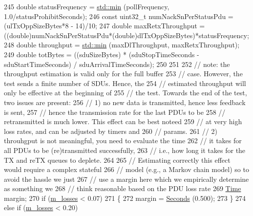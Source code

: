 \begin{DoxyCode}
245   \textcolor{keywordtype}{double} statusFrequency = \hyperlink{80211b_8c_ac6afabdc09a49a433ee19d8a9486056d}{std::min} (pollFrequency, 1.0/statusProhibitSeconds);
246   \textcolor{keyword}{const} uint32\_t numNackSnPerStatusPdu = (ulTxOppSizeBytes*8 - 14)/10;
247   \textcolor{keywordtype}{double} maxRetxThroughput = ((double)numNackSnPerStatusPdu*(\textcolor{keywordtype}{double})dlTxOppSizeBytes)*statusFrequency;
248   \textcolor{keywordtype}{double} throughput = \hyperlink{80211b_8c_ac6afabdc09a49a433ee19d8a9486056d}{std::min} (maxDlThroughput, maxRetxThroughput);
249   \textcolor{keywordtype}{double} totBytes = ((sduSizeBytes) * (sduStopTimeSeconds - sduStartTimeSeconds) / sduArrivalTimeSeconds);
250 
251 
252   \textcolor{comment}{// note: the throughput estimation is valid only for the full buffer}
253   \textcolor{comment}{// case. However, the test sends a finite number of SDUs. Hence, the}
254   \textcolor{comment}{// estimated throughput will only be effective at the beginning of}
255   \textcolor{comment}{// the test. Towards the end of the test, two issues are present:}
256   \textcolor{comment}{//   1) no new data is transmitted, hence less feedback is sent,}
257   \textcolor{comment}{//      hence the transmission rate for the last PDUs to be}
258   \textcolor{comment}{//      retransmitted is much lower. This effect can be best noteed}
259   \textcolor{comment}{//      at very high loss rates, and can be adjusted by timers and}
260   \textcolor{comment}{//      params.}
261   \textcolor{comment}{//   2) throuhgput is not meaningful, you need to evaluate the time}
262   \textcolor{comment}{//      it takes for all PDUs to be (re)transmitted successfully,}
263   \textcolor{comment}{//      i.e., how long it takes for the TX and reTX queues to deplete.}
264 
265   \textcolor{comment}{// Estimating correctly this effect would require a complex stateful}
266   \textcolor{comment}{// model (e.g., a Markov chain model) so to avoid the hassle we just}
267   \textcolor{comment}{// use a margin here which we empirically determine as something we}
268   \textcolor{comment}{// think reasonable based on the PDU loss rate}
269   \hyperlink{classns3_1_1Time}{Time} margin;
270   \textcolor{keywordflow}{if} (\hyperlink{classLteRlcAmE2eTestCase_afbb72ea6f3599c57b19be03be5e43878}{m\_losses} < 0.07)
271     \{
272       margin = \hyperlink{group__timecivil_ga33c34b816f8ff6628e33d5c8e9713b9e}{Seconds} (0.500);
273     \}
274   \textcolor{keywordflow}{else} \textcolor{keywordflow}{if} (\hyperlink{classLteRlcAmE2eTestCase_afbb72ea6f3599c57b19be03be5e43878}{m\_losses} < 0.20)

\end{DoxyCode}
